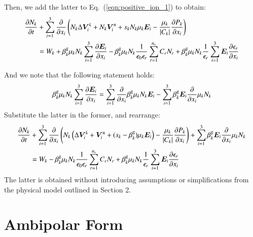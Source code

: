 \documentclass{warpdoc}
\newcommand{\ns}{{n_{\rm s}}}
\renewcommand{\vec}[1]{\bm{#1}}
\begin{document}
Then, we add the latter to Eq.\ (\ref{eqn:positive_ion_1}) to obtain:
%
\begin{align}
  \frac{\partial N_k}{\partial t} &+ \sum_{i=1}^3 \frac{\partial}{\partial x_i}  \left(N_k \Delta \vec{V}^k_i+N_k \vec{V}^{\rm n}_i+ s_k N_k \mu_k  \vec{E}_i
             -   \frac{\mu_k}{|C_k|} \frac{\partial P_k}{\partial x_i}\right) \nonumber \\
&= W_k
+\beta_k^{\rm g} \mu_{k} N_{k}  \sum_{i=1}^3 \frac{\partial \vec{E}_i}{\partial x_i}  
-\beta_k^{\rm g} \mu_{k} N_{k}\frac{1}{\epsilon_0 \epsilon_r} \sum_{r=1}^\ns C_r N_r 
+\beta_k^{\rm g} \mu_{k} N_{k}\frac{1}{\epsilon_r} \sum_{i=1}^3 \vec{E}_i \frac{\partial \epsilon_r}{\partial x_i}  
\end{align}
%



And we note that the following statement holds:
%
\begin{equation}
\beta_k^{\rm g} \mu_{k} N_{k} \sum_{i=1}^3 \frac{\partial \vec{E}_i}{\partial x_i}
= \sum_{i=1}^3 \frac{\partial }{\partial x_i} \beta_k^{\rm g} \mu_{k} N_{k} \vec{E}_i
 - \sum_{i=1}^3 \beta_k^{\rm g} \vec{E}_i \frac{\partial }{\partial x_i} \mu_{k} N_{k}
\end{equation}
%
Substitute the latter in the former, and rearrange:
%
\begin{align}
  \frac{\partial N_k}{\partial t} &+ \sum_{i=1}^3 \frac{\partial}{\partial x_i}  \left(N_k \left( \Delta \vec{V}^k_i + \vec{V}^{\rm n}_i+ (s_k-\beta_k^{\rm g}) \mu_k  \vec{E}_i \right)
             -   \frac{\mu_k}{|C_k|} \frac{\partial P_k}{\partial x_i}\right) 
+ \sum_{i=1}^3 \beta_k^{\rm g} \vec{E}_i \frac{\partial }{\partial x_i} \mu_{k} N_{k}
\nonumber \\
&= W_k
-\beta_k^{\rm g} \mu_{k} N_{k}\frac{1}{\epsilon_0 \epsilon_r} \sum_{r=1}^\ns C_r N_r 
+\beta_k^{\rm g} \mu_{k} N_{k}\frac{1}{\epsilon_r} \sum_{i=1}^3 \vec{E}_i \frac{\partial \epsilon_r}{\partial x_i}  
\end{align}
%
The latter is  obtained without introducing assumptions or simplifications from the physical model outlined in Section 2.




\section{Ambipolar Form}
\end{document}
